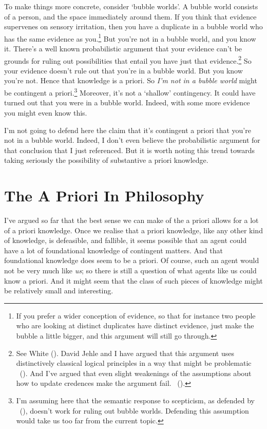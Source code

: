 \documentclass[
  10pt,
  letterpaper,
  DIV=11,
  numbers=noendperiod,
  twoside]{scrartcl}
\begin{document}
To make things more concrete, consider `bubble worlds'. A bubble world
consists of a person, and the space immediately around them. If you
think that evidence supervenes on sensory irritation, then you have a
duplicate in a bubble world who has the same evidence as you.\footnote{If
  you prefer a wider conception of evidence, so that for instance two
  people who are looking at distinct duplicates have distinct evidence,
  just make the bubble a little bigger, and this argument will still go
  through.} But you're not in a bubble world, and you know it. There's a
well known probabilistic argument that your evidence can't be grounds
for ruling out possibilities that entail you have just that
evidence.\footnote{See White (). David
  Jehle and I have argued that this argument uses distinctively
  classical logical principles in a way that might be problematic
  ~(). And I've
  argued that even slight weakenings of the assumptions about how to
  update credences make the argument fail.
  ~().} So your evidence
doesn't rule out that you're in a bubble world. But you know you're not.
Hence that knowledge is a priori. So \emph{I'm not in a bubble world}
might be contingent a priori.\footnote{I'm assuming here that the
  semantic response to scepticism, as defended by
  ~(), doesn't work for
  ruling out bubble worlds. Defending this assumption would take us too
  far from the current topic.} Moreover, it's not a `shallow'
contingency. It could have turned out that you were in a bubble world.
Indeed, with some more evidence you might even know this.

I'm not going to defend here the claim that it's contingent a priori
that you're not in a bubble world. Indeed, I don't even believe the
probabilistic argument for that conclusion that I just referenced. But
it is worth noting this trend towards taking seriously the possibility
of substantive a priori knowledge.

\section{The A Priori In Philosophy}\label{theaprioriinphilosophy}

I've argued so far that the best sense we can make of the a priori
allows for a lot of a priori knowledge. Once we realise that a priori
knowledge, like any other kind of knowledge, is defeasible, and
fallible, it seems possible that an agent could have a lot of
foundational knowledge of contingent matters. And that foundational
knowledge does seem to be a priori. Of course, such an agent would not
be very much like \emph{us}; so there is still a question of what agents
like us could know a priori. And it might seem that the class of such
pieces of knowledge might be relatively small and interesting.
\end{document}
